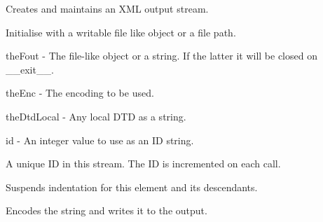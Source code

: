 \documentclass[letterpaper,10pt,english]{sphinxmanual}
\begin{document}
\begin{fulllineitems}
\label{\detokenize{ref/util/XmlWrite:TotalDepth.util.XmlWrite.XmlStream}}
Creates and maintains an XML output stream.

\begin{fulllineitems}
\label{\detokenize{ref/util/XmlWrite:TotalDepth.util.XmlWrite.XmlStream.__init__}}
Initialise with a writable file like object or a file path.

theFout - The file-like object or a string. If the latter it will be
closed on \_\_exit\_\_.

theEnc - The encoding to be used.

theDtdLocal - Any local DTD as a string.

id - An integer value to use as an ID string.

\end{fulllineitems}


\begin{fulllineitems}
\label{\detokenize{ref/util/XmlWrite:TotalDepth.util.XmlWrite.XmlStream.id}}
A unique ID in this stream. The ID is incremented on each call.

\end{fulllineitems}


\begin{fulllineitems}
\label{\detokenize{ref/util/XmlWrite:TotalDepth.util.XmlWrite.XmlStream.xmlSpacePreserve}}
Suspends indentation for this element and its descendants.

\end{fulllineitems}


\begin{fulllineitems}
\label{\detokenize{ref/util/XmlWrite:TotalDepth.util.XmlWrite.XmlStream.characters}}
Encodes the string and writes it to the output.


\end{fulllineitems}
\end{fulllineitems}
\end{document}
